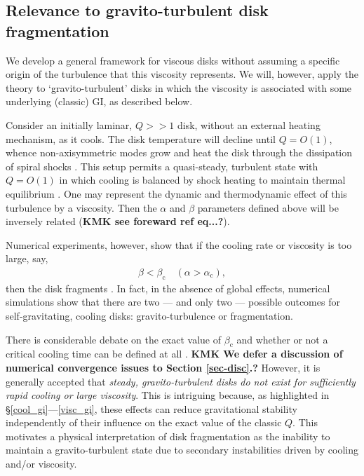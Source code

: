 \documentclass[iop, numberedappendix]{emulateapj}
\begin{document}

\subsection{Relevance to gravito-turbulent disk fragmentation}
We develop a general framework for viscous disks without  
assuming a specific origin of the turbulence that this viscosity 
represents. %
We will, however, apply the theory to `gravito-turbulent'
disks in which the viscosity is associated with some underlying (classic)
GI, as described below.  

Consider an initially laminar, $Q>>1$ disk, without an external heating mechanism, as it
cools. The disk temperature will decline until $Q=O(1)$, whence
non-axisymmetric modes grow and heat the disk through the dissipation
of spiral shocks \citep{cossins09}. %
This setup permits a quasi-steady, turbulent state with
$Q =O(1)$ in which cooling is balanced by shock heating to maintain
thermal equilibrium \citep{gammie01}. 
One may represent the dynamic and thermodynamic effect of this turbulence by a
viscosity. Then the $\alpha$ and $\beta$ parameters defined above will
be inversely related ({\bf KMK see foreward ref eq...?}).  

Numerical experiments, however, show that if the cooling rate or
viscosity is too large, say,   
\begin{align}\label{frag_cond}
  \beta < \beta_\mathrm{c} \quad
  \left(\alpha>\alpha_\mathrm{c}\right), 
\end{align}
then the disk fragments \citep{gammie01,rice05,rice11}. In fact, in
the absence of global effects, numerical simulations show that there are
two --- and only two --- possible outcomes for self-gravitating,
cooling disks: gravito-turbulence or fragmentation. %

There is considerable debate on the exact value of $\beta_\mathrm{c}$ 
and whether or not a critical cooling time can be defined at all 
\citep{meru11,lodato11,meru12,paardekooper12,hopkins13}. {\bf KMK We defer a discussion of
numerical convergence issues to Section \ref{sec-disc}.?}
However, it is generally accepted that \emph{steady, gravito-turbulent
  disks do not  
  exist for sufficiently rapid cooling or large viscosity}.  
This  is intriguing because, as highlighted in
\S\ref{cool_gi}---\ref{visc_gi}, these effects can reduce
gravitational stability independently of their influence on the exact value of the classic $Q$. This motivates a physical    
interpretation of disk fragmentation as the inability to maintain a
gravito-turbulent state due to %
secondary instabilities driven by cooling and/or viscosity.
\end{document}
